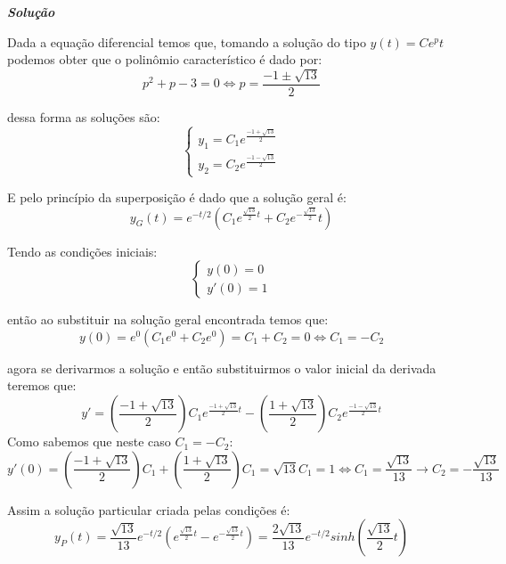 \linespread{1.5}

\textit{\textbf{Solução}}

Dada a equação diferencial temos que, tomando a solução do tipo $ y(t) = Ce^pt $ podemos obter que o polinômio característico é dado por:
\begin{equation*}
    p^2 + p -3 = 0 \Longleftrightarrow p = \frac{-1 \pm \sqrt{13}}{2}
\end{equation*}

dessa forma as soluções são:
\begin{equation*}
    \begin{cases}
    y_1 = C_1e^{\frac{-1 + \sqrt{13}}{2}}\\
    y_2 = C_2e^{\frac{-1 - \sqrt{13}}{2}}
    \end{cases}
\end{equation*}

E pelo princípio da superposição é dado que a solução geral é:
\begin{equation*}
    y_G(t) = e^{-t/2}(C_1e^{\frac{\sqrt{13}}{2}t} + C_2e^{-\frac{\sqrt{13}}{2}}t)
\end{equation*}

Tendo as condições iniciais:
\begin{equation*}
    \begin{cases}
        y(0)=0\\
        y'(0)=1
    \end{cases}
\end{equation*}

então ao substituir na solução geral encontrada temos que:
\begin{equation*}
    y(0) = e^0(C_1e^0+C_2e^0)= C_1 + C_2 = 0 \Longleftrightarrow C_1 = - C_2
\end{equation*}

agora se derivarmos a solução e então substituirmos o valor inicial da derivada teremos que:
\begin{equation*}
    y' = \left(\frac{-1+\sqrt{13}}{2}\right)C_1e^{\frac{-1+\sqrt{13}}{2}t} - \left(\frac{1+\sqrt{13}}{2}\right)C_2e^{\frac{-1-\sqrt{13}}{2}t}
\end{equation*}
Como sabemos que neste caso $C_1 = - C_2$:
\begin{equation*}
    y'(0) = \left(\frac{-1+\sqrt{13}}{2}\right)C_1 + \left(\frac{1+\sqrt{13}}{2}\right)C_1 = \sqrt{13}C_1 = 1 \Longleftrightarrow C_1 = \frac{\sqrt{13}}{13} \rightarrow C_2 = - \frac{\sqrt{13}}{13}
\end{equation*}

Assim a solução particular criada pelas condições é:
\begin{equation*}
    y_P(t) = \frac{\sqrt{13}}{13}e^{-t/2}\left(e^{\frac{\sqrt{13}}{2}t} - e^{-\frac{\sqrt{13}}{2}t}\right) = \frac{2\sqrt{13}}{13}e^{-t/2}sinh\left(\frac{\sqrt{13}}{2}t\right)
\end{equation*}